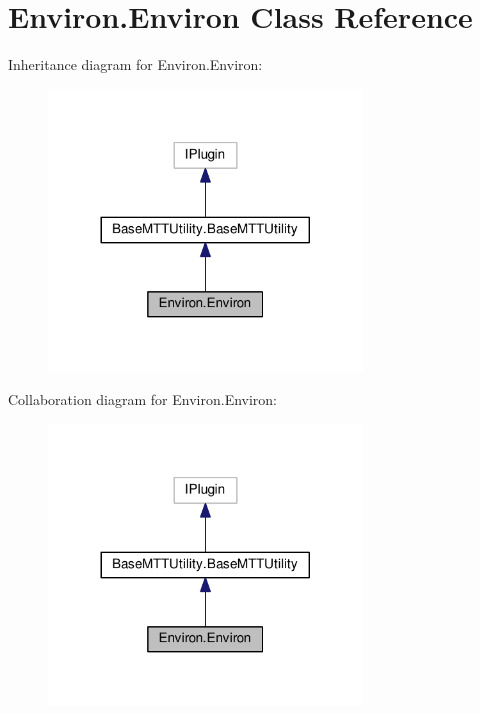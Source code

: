 \hypertarget{class_environ_1_1_environ}{\section{Environ.\-Environ Class Reference}
\label{class_environ_1_1_environ}
}


Inheritance diagram for Environ.\-Environ\-:
\nopagebreak
\begin{figure}[H]
\begin{center}
\leavevmode
\includegraphics[width=236pt]{class_environ_1_1_environ__inherit__graph}
\end{center}
\end{figure}


Collaboration diagram for Environ.\-Environ\-:
\nopagebreak
\begin{figure}[H]
\begin{center}
\leavevmode
\includegraphics[width=236pt]{class_environ_1_1_environ__coll__graph}
\end{center}
\end{figure}
